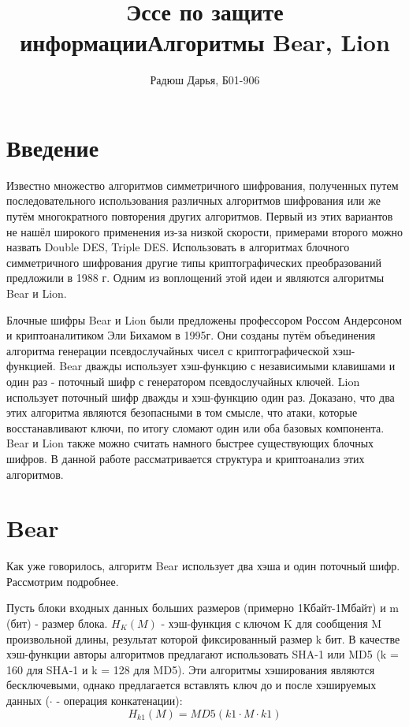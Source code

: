 \documentclass[12pt]{article}
\title{Эссе по защите информации}
\title{Алгоритмы Bear, Lion}
\author{Радюш Дарья, Б01-906}
\begin{document}
\maketitle



\section{Введение}

Известно множество алгоритмов симметричного шифрования, полученных путем последовательного использования различных алгоритмов шифрования или же путём многократного повторения других алгоритмов. Первый из этих вариантов не нашёл широкого применения из-за низкой скорости, примерами второго можно назвать Double DES, Triple DES. Использовать в алгоритмах блочного симметричного шифрования другие типы криптографических преобразований предложили в 1988 г. Одним из воплощений этой идеи и являются алгоритмы Bear и Lion.  

Блочные шифры Bear и Lion были предложены профессором Россом Андерсоном и криптоаналитиком Эли Бихамом в 1995г. Они созданы путём объединения алгоритма генерации псевдослучайных чисел с криптографической хэш-функцией. Bear дважды использует хэш-функцию с независимыми клавишами и один раз - поточный шифр с генератором псевдослучайных ключей. Lion использует поточный шифр дважды и хэш-функцию один раз. Доказано, что два этих алгоритма являются безопасными в том смысле, что атаки, которые восстанавливают ключи, по итогу сломают один или оба базовых компонента.  Bear и Lion также можно считать намного быстрее существующих блочных шифров. В данной работе рассматривается структура и криптоанализ этих алгоритмов.

\section{Bear}

Как уже говорилось, алгоритм Bear использует два хэша и один поточный шифр. Рассмотрим подробнее.

Пусть блоки входных данных больших размеров (примерно 1Кбайт-1Мбайт) и m (бит) - размер блока. ${H_{K}(M)}$ - хэш-функция с ключом K для сообщения M произвольной длины, результат которой фиксированный размер k бит. В качестве хэш-функции авторы алгоритмов предлагают использовать SHA-1 или MD5 (k = 160 для SHA-1 и k = 128 для MD5). Эти алгоритмы хэширования являются бесключевыми, однако предлагается вставлять ключ до и после хэшируемых данных (${\cdot}$ - операция конкатенации):
                 \[H_{k1}(M) = {MD5(k1\cdot M \cdot k1)}\]
                  
\end{document}

